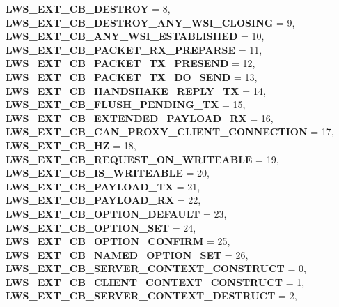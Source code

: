 \begin{DoxyCompactItemize}
{\bfseries L\+W\+S\+\_\+\+E\+X\+T\+\_\+\+C\+B\+\_\+\+D\+E\+S\+T\+R\+OY} = 8, 
{\bfseries L\+W\+S\+\_\+\+E\+X\+T\+\_\+\+C\+B\+\_\+\+D\+E\+S\+T\+R\+O\+Y\+\_\+\+A\+N\+Y\+\_\+\+W\+S\+I\+\_\+\+C\+L\+O\+S\+I\+NG} = 9, 
{\bfseries L\+W\+S\+\_\+\+E\+X\+T\+\_\+\+C\+B\+\_\+\+A\+N\+Y\+\_\+\+W\+S\+I\+\_\+\+E\+S\+T\+A\+B\+L\+I\+S\+H\+ED} = 10, 
\newline
{\bfseries L\+W\+S\+\_\+\+E\+X\+T\+\_\+\+C\+B\+\_\+\+P\+A\+C\+K\+E\+T\+\_\+\+R\+X\+\_\+\+P\+R\+E\+P\+A\+R\+SE} = 11, 
{\bfseries L\+W\+S\+\_\+\+E\+X\+T\+\_\+\+C\+B\+\_\+\+P\+A\+C\+K\+E\+T\+\_\+\+T\+X\+\_\+\+P\+R\+E\+S\+E\+ND} = 12, 
{\bfseries L\+W\+S\+\_\+\+E\+X\+T\+\_\+\+C\+B\+\_\+\+P\+A\+C\+K\+E\+T\+\_\+\+T\+X\+\_\+\+D\+O\+\_\+\+S\+E\+ND} = 13, 
{\bfseries L\+W\+S\+\_\+\+E\+X\+T\+\_\+\+C\+B\+\_\+\+H\+A\+N\+D\+S\+H\+A\+K\+E\+\_\+\+R\+E\+P\+L\+Y\+\_\+\+TX} = 14, 
\newline
{\bfseries L\+W\+S\+\_\+\+E\+X\+T\+\_\+\+C\+B\+\_\+\+F\+L\+U\+S\+H\+\_\+\+P\+E\+N\+D\+I\+N\+G\+\_\+\+TX} = 15, 
{\bfseries L\+W\+S\+\_\+\+E\+X\+T\+\_\+\+C\+B\+\_\+\+E\+X\+T\+E\+N\+D\+E\+D\+\_\+\+P\+A\+Y\+L\+O\+A\+D\+\_\+\+RX} = 16, 
{\bfseries L\+W\+S\+\_\+\+E\+X\+T\+\_\+\+C\+B\+\_\+\+C\+A\+N\+\_\+\+P\+R\+O\+X\+Y\+\_\+\+C\+L\+I\+E\+N\+T\+\_\+\+C\+O\+N\+N\+E\+C\+T\+I\+ON} = 17, 
{\bfseries L\+W\+S\+\_\+\+E\+X\+T\+\_\+\+C\+B\+\_\+HZ} = 18, 
\newline
{\bfseries L\+W\+S\+\_\+\+E\+X\+T\+\_\+\+C\+B\+\_\+\+R\+E\+Q\+U\+E\+S\+T\+\_\+\+O\+N\+\_\+\+W\+R\+I\+T\+E\+A\+B\+LE} = 19, 
{\bfseries L\+W\+S\+\_\+\+E\+X\+T\+\_\+\+C\+B\+\_\+\+I\+S\+\_\+\+W\+R\+I\+T\+E\+A\+B\+LE} = 20, 
{\bfseries L\+W\+S\+\_\+\+E\+X\+T\+\_\+\+C\+B\+\_\+\+P\+A\+Y\+L\+O\+A\+D\+\_\+\+TX} = 21, 
{\bfseries L\+W\+S\+\_\+\+E\+X\+T\+\_\+\+C\+B\+\_\+\+P\+A\+Y\+L\+O\+A\+D\+\_\+\+RX} = 22, 
\newline
{\bfseries L\+W\+S\+\_\+\+E\+X\+T\+\_\+\+C\+B\+\_\+\+O\+P\+T\+I\+O\+N\+\_\+\+D\+E\+F\+A\+U\+LT} = 23, 
{\bfseries L\+W\+S\+\_\+\+E\+X\+T\+\_\+\+C\+B\+\_\+\+O\+P\+T\+I\+O\+N\+\_\+\+S\+ET} = 24, 
{\bfseries L\+W\+S\+\_\+\+E\+X\+T\+\_\+\+C\+B\+\_\+\+O\+P\+T\+I\+O\+N\+\_\+\+C\+O\+N\+F\+I\+RM} = 25, 
{\bfseries L\+W\+S\+\_\+\+E\+X\+T\+\_\+\+C\+B\+\_\+\+N\+A\+M\+E\+D\+\_\+\+O\+P\+T\+I\+O\+N\+\_\+\+S\+ET} = 26, 
\newline
{\bfseries L\+W\+S\+\_\+\+E\+X\+T\+\_\+\+C\+B\+\_\+\+S\+E\+R\+V\+E\+R\+\_\+\+C\+O\+N\+T\+E\+X\+T\+\_\+\+C\+O\+N\+S\+T\+R\+U\+CT} = 0, 
{\bfseries L\+W\+S\+\_\+\+E\+X\+T\+\_\+\+C\+B\+\_\+\+C\+L\+I\+E\+N\+T\+\_\+\+C\+O\+N\+T\+E\+X\+T\+\_\+\+C\+O\+N\+S\+T\+R\+U\+CT} = 1, 
{\bfseries L\+W\+S\+\_\+\+E\+X\+T\+\_\+\+C\+B\+\_\+\+S\+E\+R\+V\+E\+R\+\_\+\+C\+O\+N\+T\+E\+X\+T\+\_\+\+D\+E\+S\+T\+R\+U\+CT} = 2, 

\end{DoxyCompactItemize}
